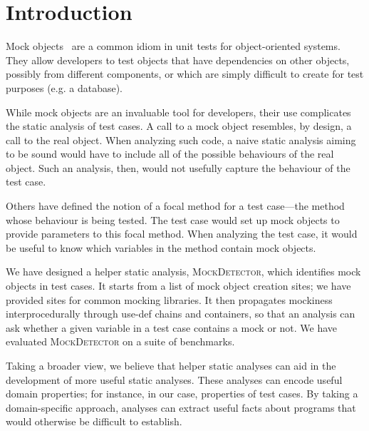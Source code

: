 \section{Introduction}
Mock objects~\cite{beck02:_test_driven_devel} are a common idiom in
unit tests for object-oriented systems.  They allow developers to test
objects that have dependencies on other objects, possibly from
different components, or which are simply difficult to create for test
purposes (e.g. a database).

While mock objects are an invaluable tool for developers, their use
complicates the static analysis of test cases. A call to a mock object
resembles, by design, a call to the real object. When analyzing such
code, a naive static analysis aiming to be sound would have to include
all of the possible behaviours of the real object. Such an analysis,
then, would not usefully capture the behaviour of the test case.


Others have defined the notion of a focal method for a test case---the method
whose behaviour is being tested. %
The test case would set up mock objects to provide parameters to this focal method.
When analyzing the test case, it would be useful to know which variables in the
method contain mock objects.

We have designed a helper static analysis, \textsc{MockDetector}, which identifies
mock objects in test cases. It starts from a list of mock object creation sites; we
have provided sites for common mocking libraries. It then propagates mockiness
interprocedurally through use-def chains and containers, so that an analysis
can ask whether a given variable in a test case contains a mock or not. We have
evaluated \textsc{MockDetector} on a suite of benchmarks. %

Taking a broader view, we believe that helper static analyses can aid
in the development of more useful static analyses. These analyses can
encode useful domain properties; for instance, in our case, properties
of test cases. By taking a domain-specific approach, analyses can extract
useful facts about programs that would otherwise be difficult to establish.

